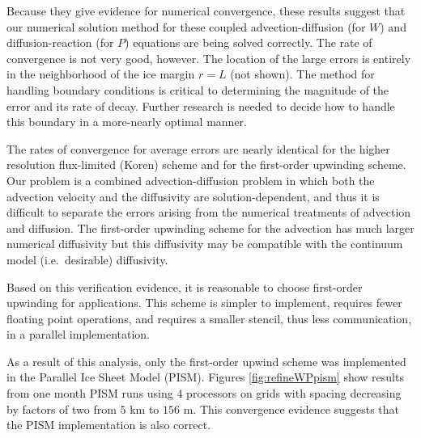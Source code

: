 \documentclass[11pt,final]{amsart}%
\begin{document}
Because they give evidence for numerical convergence, these results suggest that our numerical solution method for these coupled advection-diffusion (for $W$) and diffusion-reaction (for $P$) equations are being solved correctly.  The rate of convergence is not very good, however.  The location of the large errors is entirely in the neighborhood of the ice margin $r=L$ (not shown).  The method for handling boundary conditions is critical to determining the magnitude of the error and its rate of decay.  Further research is needed to decide how to handle this boundary in a more-nearly optimal manner.

The rates of convergence for average errors are nearly identical for the higher resolution flux-limited (Koren) scheme and for the first-order upwinding scheme.  Our problem is a combined advection-diffusion problem in which both the advection velocity and the diffusivity are solution-dependent, and thus it is difficult to separate the errors arising from the numerical treatments of advection and diffusion.  The first-order upwinding scheme for the advection has much larger numerical diffusivity but this diffusivity may be compatible with the continuum model (i.e.~desirable) diffusivity.

Based on this verification evidence, it is reasonable to choose first-order upwinding for applications.  This scheme is simpler to implement, requires fewer floating point operations, and requires a smaller stencil, thus less communication, in a parallel implementation.

As a result of this analysis, only the first-order upwind scheme was implemented in the Parallel Ice Sheet Model (PISM).  Figures \ref{fig:refineWPpism} show results from one month PISM runs using 4 processors on grids with spacing decreasing by factors of two from $5$ km to $156$ m.  This convergence evidence suggests that the PISM implementation is also correct.
\end{document}
